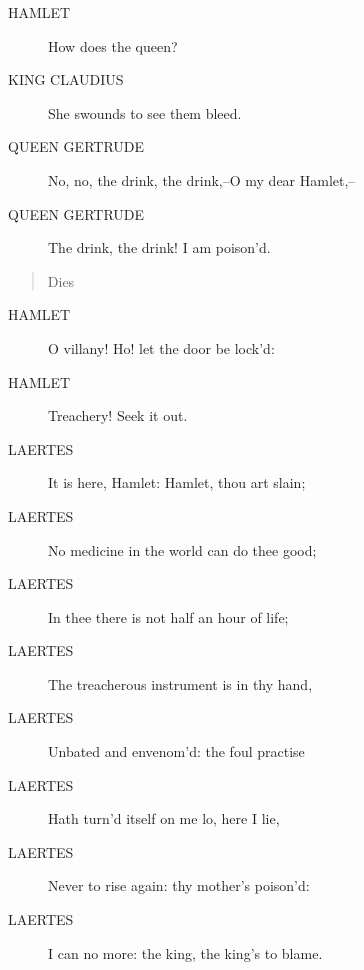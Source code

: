 \documentclass{article}
\begin{document}
\begin{description}
            
\item[HAMLET] How does the queen?
\end{description}
          
\begin{description}
            
\item[KING CLAUDIUS] She swounds to see them bleed.
\end{description}
          
\begin{description}
            
\item[QUEEN GERTRUDE] No, no, the drink, the drink,--O my dear Hamlet,--
\item[QUEEN GERTRUDE] The drink, the drink! I am poison'd.
\end{description}
          
\begin{quote}
Dies
\end{quote}
          
\begin{description}
            
\item[HAMLET] O villany! Ho! let the door be lock'd:
\item[HAMLET] Treachery! Seek it out.
\end{description}
          
\begin{description}
            
\item[LAERTES] It is here, Hamlet: Hamlet, thou art slain;
\item[LAERTES] No medicine in the world can do thee good;
\item[LAERTES] In thee there is not half an hour of life;
\item[LAERTES] The treacherous instrument is in thy hand,
\item[LAERTES] Unbated and envenom'd: the foul practise
\item[LAERTES] Hath turn'd itself on me lo, here I lie,
\item[LAERTES] Never to rise again: thy mother's poison'd:
\item[LAERTES] I can no more: the king, the king's to blame.
\end{description}
          
\end{document}
